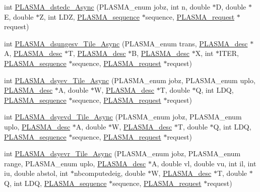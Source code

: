 \begin{DoxyCompactItemize}
\item 
int \hyperlink{group__double__Tile__Async_ga8492e843ff342bc0b3bba8c26120bb0b_ga8492e843ff342bc0b3bba8c26120bb0b}{P\+L\+A\+S\+M\+A\+\_\+dstedc\+\_\+\+Async} (P\+L\+A\+S\+M\+A\+\_\+enum jobz, int n, double $\ast$D, double $\ast$E, double $\ast$Z, int L\+D\+Z, \hyperlink{structplasma__sequence__t}{P\+L\+A\+S\+M\+A\+\_\+sequence} $\ast$sequence, \hyperlink{structplasma__request__t}{P\+L\+A\+S\+M\+A\+\_\+request} $\ast$request)
\item 
int \hyperlink{group__double__Tile__Async_ga7c8186622ba151278d777a7db46a7373_ga7c8186622ba151278d777a7db46a7373}{P\+L\+A\+S\+M\+A\+\_\+dsungesv\+\_\+\+Tile\+\_\+\+Async} (P\+L\+A\+S\+M\+A\+\_\+enum trans, \hyperlink{structplasma__desc__t}{P\+L\+A\+S\+M\+A\+\_\+desc} $\ast$A, \hyperlink{structplasma__desc__t}{P\+L\+A\+S\+M\+A\+\_\+desc} $\ast$T, \hyperlink{structplasma__desc__t}{P\+L\+A\+S\+M\+A\+\_\+desc} $\ast$B, \hyperlink{structplasma__desc__t}{P\+L\+A\+S\+M\+A\+\_\+desc} $\ast$X, int $\ast$I\+T\+E\+R, \hyperlink{structplasma__sequence__t}{P\+L\+A\+S\+M\+A\+\_\+sequence} $\ast$sequence, \hyperlink{structplasma__request__t}{P\+L\+A\+S\+M\+A\+\_\+request} $\ast$request)
\item 
int \hyperlink{group__double__Tile__Async_ga359a5a8951f733039b4944491a170d56_ga359a5a8951f733039b4944491a170d56}{P\+L\+A\+S\+M\+A\+\_\+dsyev\+\_\+\+Tile\+\_\+\+Async} (P\+L\+A\+S\+M\+A\+\_\+enum jobz, P\+L\+A\+S\+M\+A\+\_\+enum uplo, \hyperlink{structplasma__desc__t}{P\+L\+A\+S\+M\+A\+\_\+desc} $\ast$A, double $\ast$W, \hyperlink{structplasma__desc__t}{P\+L\+A\+S\+M\+A\+\_\+desc} $\ast$T, double $\ast$Q, int L\+D\+Q, \hyperlink{structplasma__sequence__t}{P\+L\+A\+S\+M\+A\+\_\+sequence} $\ast$sequence, \hyperlink{structplasma__request__t}{P\+L\+A\+S\+M\+A\+\_\+request} $\ast$request)
\item 
int \hyperlink{group__double__Tile__Async_gaeca41c0f8b0f3a3fffeb22069611adf8_gaeca41c0f8b0f3a3fffeb22069611adf8}{P\+L\+A\+S\+M\+A\+\_\+dsyevd\+\_\+\+Tile\+\_\+\+Async} (P\+L\+A\+S\+M\+A\+\_\+enum jobz, P\+L\+A\+S\+M\+A\+\_\+enum uplo, \hyperlink{structplasma__desc__t}{P\+L\+A\+S\+M\+A\+\_\+desc} $\ast$A, double $\ast$W, \hyperlink{structplasma__desc__t}{P\+L\+A\+S\+M\+A\+\_\+desc} $\ast$T, double $\ast$Q, int L\+D\+Q, \hyperlink{structplasma__sequence__t}{P\+L\+A\+S\+M\+A\+\_\+sequence} $\ast$sequence, \hyperlink{structplasma__request__t}{P\+L\+A\+S\+M\+A\+\_\+request} $\ast$request)
\item 
int \hyperlink{group__double__Tile__Async_gadcc8c98dd7c4b7059ef3015f6a9cd0f8_gadcc8c98dd7c4b7059ef3015f6a9cd0f8}{P\+L\+A\+S\+M\+A\+\_\+dsyevr\+\_\+\+Tile\+\_\+\+Async} (P\+L\+A\+S\+M\+A\+\_\+enum jobz, P\+L\+A\+S\+M\+A\+\_\+enum range, P\+L\+A\+S\+M\+A\+\_\+enum uplo, \hyperlink{structplasma__desc__t}{P\+L\+A\+S\+M\+A\+\_\+desc} $\ast$A, double vl, double vu, int il, int iu, double abstol, int $\ast$nbcomputedeig, double $\ast$W, \hyperlink{structplasma__desc__t}{P\+L\+A\+S\+M\+A\+\_\+desc} $\ast$T, double $\ast$Q, int L\+D\+Q, \hyperlink{structplasma__sequence__t}{P\+L\+A\+S\+M\+A\+\_\+sequence} $\ast$sequence, \hyperlink{structplasma__request__t}{P\+L\+A\+S\+M\+A\+\_\+request} $\ast$request)

\end{DoxyCompactItemize}
